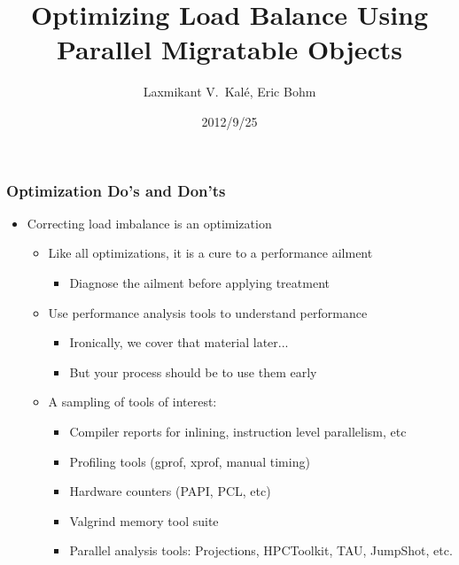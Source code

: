 \documentclass{beamer}
\title[Load Balancing]{Optimizing Load Balance Using Parallel Migratable Objects}
\institute[UIUC]{Parallel Programming Laboratory \\University of Illinois Urbana-Champaign}
\author{Laxmikant V.~Kal\'e, Eric Bohm}
\date{2012/9/25}
\begin{document}
\frame{\titlepage}

\begin{frame}[fragile]
\frametitle{Optimization Do's and Don'ts}
\begin{itemize}
 \item Correcting load imbalance is an optimization
 \begin{itemize}
  \item Like all optimizations, it is a cure to a performance ailment
  \begin{itemize}
   \item Diagnose the ailment before applying treatment
  \end{itemize}
  \item Use performance analysis tools to understand performance
  \begin{itemize}
   \item Ironically, we cover that material later...
   \item But your process should be to use them early  
  \end{itemize}
  \item A sampling of tools of interest:
  \begin{itemize}
   \item Compiler reports for inlining, instruction level parallelism,
   etc
   \item Profiling tools (gprof, xprof, manual timing)
   \item Hardware counters (PAPI, PCL, etc)
   \item Valgrind memory tool suite
   \item Parallel analysis tools: Projections, HPCToolkit, TAU,
   JumpShot, etc.
  \end{itemize}
 \end{itemize}
\end{itemize}
\end{frame}


%

\end{document}
